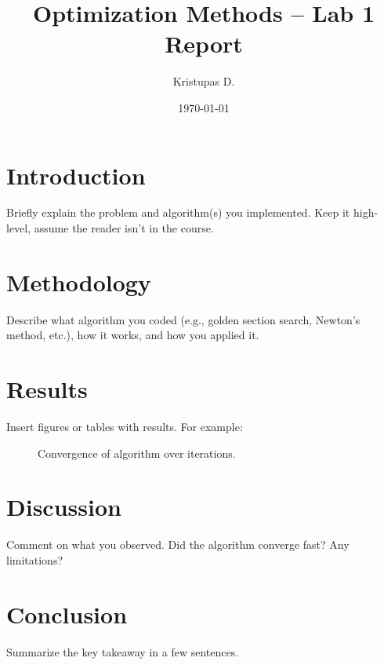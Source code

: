 \documentclass[a4paper,12pt]{article}
\title{Optimization Methods -- Lab 1 Report}
\author{Kristupas D.}
\date{\today}
\begin{document}
\maketitle

\section{Introduction}
Briefly explain the problem and algorithm(s) you implemented. Keep it high-level, assume the reader isn’t in the course.

\section{Methodology}
Describe what algorithm you coded (e.g., golden section search, Newton’s method, etc.), how it works, and how you applied it.

\section{Results}
Insert figures or tables with results. For example:

\begin{figure}[h]
    \centering
    \caption{Convergence of algorithm over iterations.}
\end{figure}

\section{Discussion}
Comment on what you observed. Did the algorithm converge fast? Any limitations?

\section{Conclusion}
Summarize the key takeaway in a few sentences.
\end{document}
